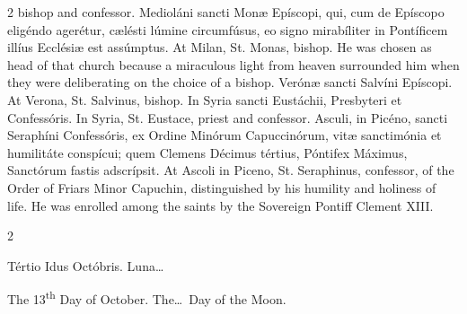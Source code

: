 \begin{paracol}{2}
 bishop and confessor.
\switchcolumn*
{}
Medioláni sancti Monæ 
 Epíscopi, qui, cum de Epíscopo eligéndo agerétur, cælésti lúmine circumfúsus, 
 eo signo mirabíliter in Pontíficem illíus Ecclésiæ est assúmptus.
\switchcolumn
{}
At Milan, St. Monas, bishop. 
 He was chosen as head of that church because a miraculous light from heaven 
 surrounded him when they were deliberating on the choice of a bishop.
\switchcolumn*
{}
Verónæ sancti Salvíni 
 Epíscopi.
\switchcolumn
{}
At Verona, St. Salvinus, bishop.
\switchcolumn*
{}
In Syria sancti 
 Eustáchii, Presbyteri et Confessóris.
\switchcolumn
{}
In Syria, St. Eustace, priest and 
 confessor.
\switchcolumn*
{}
Asculi, in Picéno, sancti Seraphíni Confessóris, ex Ordine Minórum Capuccinórum, vitæ 
 sanctimónia et humilitáte conspícui; quem Clemens Décimus tértius, Póntifex 
 Máximus, Sanctórum fastis adscrípsit.
\switchcolumn
{}
At Ascoli in Piceno, St. Seraphinus, 
 confessor, of the Order of Friars Minor Capuchin, distinguished by his 
 humility and holiness of life. He was enrolled among the saints by the 
 Sovereign Pontiff Clement XIII.
\switchcolumn*
{}
\end{paracol}


\begin{paracol}{2}
\begin{center}{\color{gregoriocolor} Tértio Idus Octóbris. 
 Luna\dots\ }\end{center}
\switchcolumn
{}
\begin{center}{\color{gregoriocolor} The   13\textsuperscript{th} Day of 
 October. The\dots\ Day of the Moon.}\end{center}
\end{paracol}

